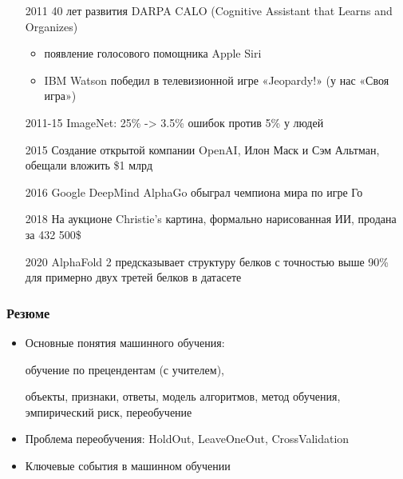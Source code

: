 \documentclass[fullscreen=true, bookmarks=true, hyperref={pdfencoding=unicode}]{beamer}
\begin{document}
\begin{frame}
  \begin{itemize}
    \item[2011] 40 лет развития DARPA CALO (Cognitive Assistant that Learns and Organizes)
       \begin{itemize}
         \item появление голосового помощника Apple Siri
         \item IBM Watson победил в телевизионной игре «Jeopardy!» (у нас «Своя игра»)
       \end{itemize}

       \pause
       \item[2011-15] ImageNet: 25\% -> 3.5\% ошибок против 5\% у людей

       \pause
       \item[2015] Создание открытой компании OpenAI, Илон Маск и Сэм Альтман, обещали вложить \$1 млрд

       \pause
       \item[2016] Google DeepMind AlphaGo обыграл чемпиона мира по игре Го

       \pause
       \item[2018] На аукционе Christie's картина, формально нарисованная ИИ, продана за 432 500\$

       \pause
       \item[2020] AlphaFold 2 предсказывает структуру белков с точностью выше 90\% для примерно двух третей белков в датасете
  \end{itemize}

\end{frame}

\begin{frame}
  \frametitle{Резюме}
  \begin{itemize}
    \item Основные понятия машинного обучения:

    обучение по прецендентам (с учителем),

    объекты, признаки, ответы, модель алгоритмов, метод обучения, эмпирический риск, переобучение

    \item Проблема переобучения: HoldOut, LeaveOneOut, CrossValidation

    \item Ключевые события в машинном обучении
  \end{itemize}
\end{frame}
\end{document}
